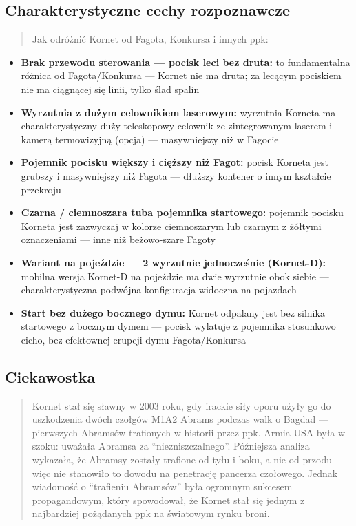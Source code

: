 \documentclass[12pt,oneside]{book}
\providecommand{\tightlist}{%
  \setlength{\itemsep}{0pt}\setlength{\parskip}{0pt}}
\begin{document}
\subsection{Charakterystyczne cechy
rozpoznawcze}\label{charakterystyczne-cechy-rozpoznawcze-53}

\begin{quote}
Jak odróżnić Kornet od Fagota, Konkursa i innych ppk:
\end{quote}

\begin{itemize}
\tightlist
\item
  \textbf{Brak przewodu sterowania --- pocisk leci bez druta:} to
  fundamentalna różnica od Fagota/Konkursa --- Kornet nie ma druta; za
  lecącym pociskiem nie ma ciągnącej się linii, tylko ślad spalin
\item
  \textbf{Wyrzutnia z dużym celownikiem laserowym:} wyrzutnia Korneta ma
  charakterystyczny duży teleskopowy celownik ze zintegrowanym laserem i
  kamerą termowizyjną (opcja) --- masywniejszy niż w Fagocie
\item
  \textbf{Pojemnik pocisku większy i cięższy niż Fagot:} pocisk Korneta
  jest grubszy i masywniejszy niż Fagota --- dłuższy kontener o innym
  kształcie przekroju
\item
  \textbf{Czarna / ciemnoszara tuba pojemnika startowego:} pojemnik
  pocisku Korneta jest zazwyczaj w kolorze ciemnoszarym lub czarnym z
  żółtymi oznaczeniami --- inne niż beżowo-szare Fagoty
\item
  \textbf{Wariant na pojeździe --- 2 wyrzutnie jednocześnie (Kornet-D):}
  mobilna wersja Kornet-D na pojeździe ma dwie wyrzutnie obok siebie ---
  charakterystyczna podwójna konfiguracja widoczna na pojazdach
\item
  \textbf{Start bez dużego bocznego dymu:} Kornet odpalany jest bez
  silnika startowego z bocznym dymem --- pocisk wylatuje z pojemnika
  stosunkowo cicho, bez efektownej erupcji dymu Fagota/Konkursa
\end{itemize}

\subsection{Ciekawostka}\label{ciekawostka-53}

\begin{quote}
Kornet stał się sławny w 2003 roku, gdy irackie siły oporu użyły go do
uszkodzenia dwóch czołgów M1A2 Abrams podczas walk o Bagdad ---
pierwszych Abramsów trafionych w historii przez ppk. Armia USA była w
szoku: uważała Abramsa za ``niezniszczalnego''. Późniejsza analiza
wykazała, że Abramsy zostały trafione od tyłu i boku, a nie od przodu
--- więc nie stanowiło to dowodu na penetrację pancerza czołowego.
Jednak wiadomość o ``trafieniu Abramsów'' była ogromnym sukcesem
propagandowym, który spowodował, że Kornet stał się jednym z najbardziej
pożądanych ppk na światowym rynku broni.
\end{quote}
\end{document}
